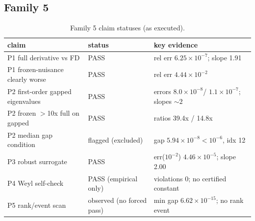 \documentclass[12pt]{article}
\begin{document}
\subsection{Family 5}
\begin{table}[ht]
\centering
\small
\caption{Family 5 claim statuses (as executed).}
\label{app:tab:f5}
\begin{tabular}{p{} p{} p{}}
\toprule
claim & status & key evidence \\
\midrule
P1 full derivative vs FD & PASS & rel err $6.25\times10^{-7}$; slope 1.91 \\
P1 frozen-nuisance clearly worse & PASS & rel err $4.44\times10^{-2}$ \\
P2 first-order gapped eigenvalues & PASS &
errors $8.0\times10^{-8}$/ $1.1\times10^{-7}$; slopes $\sim2$ \\
P2 frozen $>$10x full on gapped & PASS & ratios 39.4x / 14.8x \\
P2 median gap condition & flagged (excluded) &
gap $5.94\times10^{-8}<10^{-6}$, idx 12 \\
P3 robust surrogate & PASS &
err($10^{-2}$) $4.46\times10^{-5}$; slope 2.00 \\
P4 Weyl self-check & PASS (empirical only) &
violations 0; no certified constant \\
P5 rank/event scan & observed (no forced pass) &
min gap $6.62\times10^{-15}$; no rank event \\
\bottomrule
\end{tabular}
\end{table}
\end{document}
